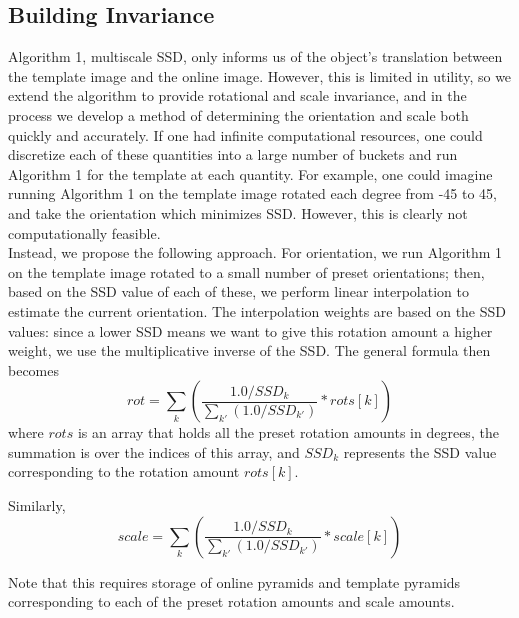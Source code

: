 \documentclass[10pt,twocolumn,letterpaper]{article}
\begin{document}
\subsection*{Building Invariance}
Algorithm 1, multiscale SSD, only informs us of the object's translation between the
template image and the online image. However, this is limited in utility, so we
extend the algorithm to provide rotational and scale invariance, and in the
process we develop a method of determining the orientation and scale both quickly
and accurately. If one had infinite computational resources, one could discretize
each of these quantities into a large number of buckets and run Algorithm 1 for
the template at each quantity. For example, one could imagine running Algorithm 1 on the template
image rotated each degree from -45 to 45, and take the orientation which minimizes SSD.
However, this is clearly not computationally feasible.\\

Instead, we propose the following approach. For orientation, we run Algorithm 1
on the template image rotated to a small number of preset orientations; then, based on the SSD value
of each of these, we perform linear interpolation to estimate the current orientation.
The interpolation weights are based on the SSD values: since a lower SSD means we want
to give this rotation amount a higher weight, we use the multiplicative inverse of the
SSD. The general formula then becomes
$$rot = \displaystyle\sum_{k}(\dfrac{1.0 / SSD_{k}}{\sum_{k'}(1.0 / SSD_{k'})} * rots[k])$$
where $rots$ is an array that holds all the preset rotation amounts in degrees,
the summation is over the indices of this array, and $SSD_{k}$ represents the SSD value
corresponding to the rotation amount $rots[k]$.

Similarly,
$$scale = \displaystyle\sum_{k}(\dfrac{1.0 / SSD_{k}}{\sum_{k'}(1.0 / SSD_{k'})} * scale[k])$$

Note that this requires storage of online pyramids and template pyramids corresponding
to each of the preset rotation amounts and scale amounts.
\end{document}
